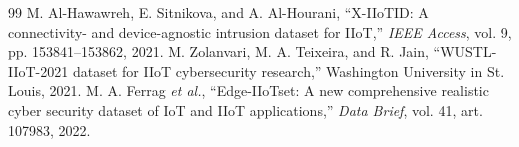 \documentclass[preprint,12pt]{elsarticle}
\begin{document}
\begin{thebibliography}{99}
 M. Al-Hawawreh, E. Sitnikova, and A. Al-Hourani, ``X-IIoTID: A connectivity- and device-agnostic intrusion dataset for IIoT,'' \textit{IEEE Access}, vol. 9, pp. 153841--153862, 2021.
 M. Zolanvari, M. A. Teixeira, and R. Jain, ``WUSTL-IIoT-2021 dataset for IIoT cybersecurity research,'' Washington University in St. Louis, 2021.
 M. A. Ferrag \textit{et al.}, ``Edge-IIoTset: A new comprehensive realistic cyber security dataset of IoT and IIoT applications,'' \textit{Data Brief}, vol. 41, art. 107983, 2022.
\end{thebibliography}
\end{document}

